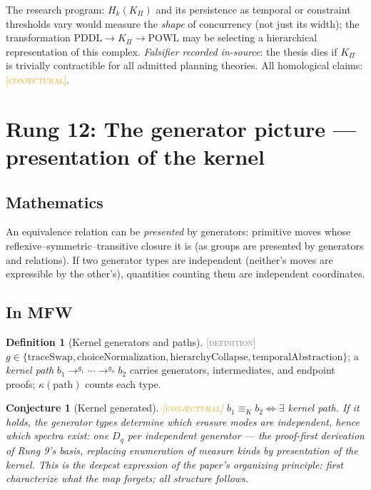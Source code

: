 \documentclass[11pt]{article}
\newcommand{\DEFINITION}{\textcolor{gray}{\textsc{[definition]}}}
\newcommand{\CONJECTURAL}{\textcolor{orange}{\textsc{[conjectural]}}}
\newcommand{\PT}{\Pi}
\newcommand{\kerEq}{\equiv_{K}}
\theoremstyle{plain}
\newtheorem{conjecture}[theorem]{Conjecture}
\theoremstyle{definition}
\newtheorem{definition}[theorem]{Definition}
\theoremstyle{remark}
\begin{document}
The research program: $H_k(K_\PT)$ and its persistence as temporal or
constraint thresholds vary would measure the \emph{shape} of concurrency
(not just its width); the transformation
$\mathrm{PDDL} \to K_\PT \to \mathrm{POWL}$ may be selecting a hierarchical
representation of this complex. \emph{Falsifier recorded in-source}: the
thesis dies if $K_\PT$ is trivially contractible for all admitted planning
theories. All homological claims: \CONJECTURAL.

\section{Rung 12: The generator picture --- presentation of the kernel}
\label{sec:rung12}

\subsection{Mathematics}
An equivalence relation can be \emph{presented} by generators: primitive
moves whose reflexive--symmetric--transitive closure it is (as groups are
presented by generators and relations). If two generator types are
independent (neither's moves are expressible by the other's), quantities
counting them are independent coordinates.

\subsection{In MFW}
\begin{definition}[Kernel generators and paths]\DEFINITION\;
$g \in \{\mathrm{traceSwap}, \mathrm{choiceNormalization},
\mathrm{hierarchyCollapse}, \mathrm{temporalAbstraction}\}$; a
\emph{kernel path} $b_1 \to^{g_1} \cdots \to^{g_n} b_2$ carries
generators, intermediates, and endpoint proofs; $\kappa(\mathrm{path})$
counts each type.
\end{definition}

\begin{conjecture}[Kernel generated]\CONJECTURAL\;
$b_1 \kerEq b_2 \iff \exists$ kernel path. If it holds, the generator
types determine which erasure modes are independent, hence \emph{which
spectra exist}: one $D_q$ per independent generator --- the proof-first
derivation of Rung 9's basis, replacing enumeration of measure kinds by
presentation of the kernel. This is the deepest expression of the paper's
organizing principle: \emph{first characterize what the map forgets; all
structure follows.}
\end{conjecture}
\end{document}
